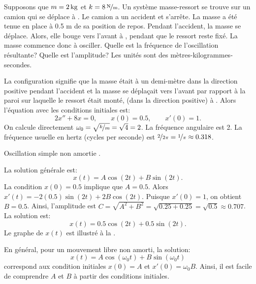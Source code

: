\begin{example}
Supposons que $m=\unit[2]{kg}$ et $k=\unitfrac[8]{N}{m}$.  Un système masse-ressort se trouve sur un camion qui se déplace à  .
Le camion a un accident et s'arrête.  La masse a été tenue en place à 0.5 m de sa position de repos. Pendant l'accident, la masse se déplace. Alors, elle bouge vers l'avant à , pendant que le ressort reste fixé.   La masse commence donc à osciller. Quelle est la fréquence de l'oscillation résultante? Quelle est l'amplitude? Les unités sont des  mètres-kilogrammes-secondes.

La configuration signifie que la masse était à un demi-mètre dans la 
direction positive pendant l'accident et
 la masse se déplaçait vers l'avant par rapport à la paroi sur laquelle le ressort était monté,
(dans la direction positive) à .  Alors l'équation avec les conditions initiales est: 
\begin{equation*}
2 x'' + 8 x = 0 , \qquad x(0) = 0.5, \qquad x'(0) = 1.
\end{equation*}
On calcule directement $\omega_0 = \sqrt{\nicefrac{k}{m}} = \sqrt{4} = 2$.
La fréquence angulaire est 2.  La fréquence usuelle en hertz (cycles per
seconde) est $\nicefrac{2}{2\pi} = \nicefrac{1}{\pi} \approx 0.318$.

\begin{mywrapfig}[15]{3.25in}
\capstart
{}
\caption{Oscillation simple non amortie .\label{mv:undampedfig}}
\end{mywrapfig}

La solution générale est: 
\begin{equation*}
x(t) = A \cos (2t) + B \sin (2t) .
\end{equation*}
La condition $x(0) = 0.5$ implique que $A = 0.5$.  Alors $x'(t) = - 2(0.5) \sin (2t)
+ 2B \cos (2t)$.
Puisque $x'(0) = 1$, on obtient $B = 0.5$.  Ainsi, l'amplitude est
$C = \sqrt{A^2+B^2} = \sqrt{0.25+0.25} = \sqrt{0.5} \approx 0.707$.  La solution est: 
\begin{equation*}
x(t) = 0.5 \cos (2t) + 0.5 \sin (2t) .
\end{equation*}
Le graphe de  $x(t)$ est illustré à la  .
\end{example}

En général, pour un mouvement libre non amorti, la solution: 
\begin{equation*}
x(t) = A \cos (\omega_0 t) + B \sin (\omega_0 t) 
\end{equation*}
correspond aux condition initiales $x(0) = A$ et $x'(0) = \omega_0 B$.
Ainsi, il est facile de comprendre $A$ et $B$ à partir des conditions initiales. 

